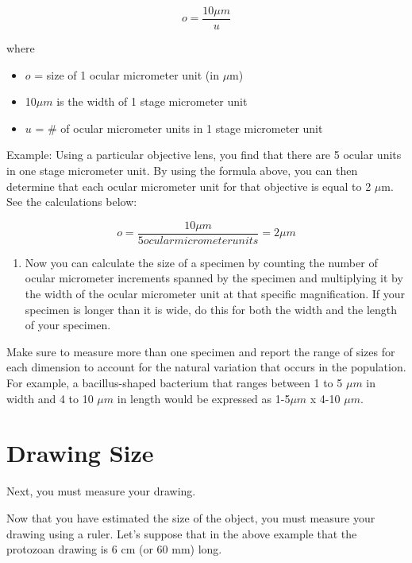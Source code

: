\documentclass[
]{book}
\providecommand{\tightlist}{%
  \setlength{\itemsep}{0pt}\setlength{\parskip}{0pt}}
\begin{document}
\[o=\frac{10\mu m}{u}\]

where

\begin{itemize}
\tightlist
\item
  \(o\) = size of 1 ocular micrometer unit (in \(\mu\)m)
\item
  10\(\mu m\) is the width of 1 stage micrometer unit
\item
  \(u\) = \# of ocular micrometer units in 1 stage micrometer unit
\end{itemize}

Example: Using a particular objective lens, you find that there are 5 ocular units in one stage micrometer unit. By using the formula above, you can then determine that each ocular micrometer unit for that objective is equal to 2 \(\mu\)m. See the calculations below:

\[o=\frac{10\mu m}{5 ocular micrometer units}=2\mu m\]

\begin{enumerate}
\def\labelenumi{\arabic{enumi}.}
\setcounter{enumi}{6}
\tightlist
\item
  Now you can calculate the size of a specimen by counting the number of ocular micrometer increments spanned by the specimen and multiplying it by the width of the ocular micrometer unit at that specific magnification. If your specimen is longer than it is wide, do this for both the width and the length of your specimen.
\end{enumerate}

Make sure to measure more than one specimen and report the range of sizes for each dimension to account for the natural variation that occurs in the population. For example, a bacillus-shaped bacterium that ranges between 1 to 5 \(\mu m\) in width and 4 to 10 \(\mu m\) in length would be expressed as 1-5\(\mu m\) x 4-10 \(\mu m\).

\hypertarget{drawing-size}{%
\section{Drawing Size}\label{drawing-size}}

Next, you must measure your drawing.

Now that you have estimated the size of the object, you must measure your drawing using a ruler. Let's suppose that in the above example that the protozoan drawing is 6 cm (or 60 mm) long.
\end{document}
